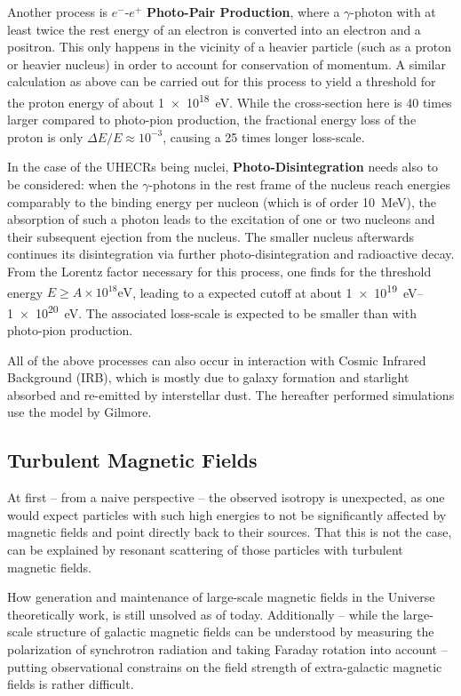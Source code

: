 Another process is $e^-$-$e^+$ \textbf{Photo-Pair Production}, where a
$\gamma$-photon with at least twice the rest energy of an electron is converted
into an electron and a positron. This only happens in the vicinity of a
heavier particle (such as a proton or heavier nucleus) in order to account for
conservation of momentum. A similar calculation as above can be carried out for
this process to yield a threshold for the proton energy of about
\SI{1e18}{\electronvolt}. While the cross-section here is 40 times larger
compared to photo-pion production, the fractional energy loss of the proton is
only $\Delta{E}/E\approx10^{-3}$, causing a 25 times longer
loss-scale.

In the case of the UHECRs being nuclei, \textbf{Photo-Disintegration} needs
also to
be considered: when the $\gamma$-photons in the rest frame of the nucleus reach
energies comparably to the binding energy per nucleon (which is of order
\SI{10}{\mega\electronvolt}), the absorption of such a photon leads to the
excitation of one or two nucleons and their subsequent ejection from the
nucleus. The smaller nucleus afterwards continues its disintegration via
further photo-disintegration and radioactive decay. From the Lorentz factor
necessary for this process, one finds for the threshold energy
$E\ge{A\times10^{18}}\si{\electronvolt}$, leading to a expected cutoff at about
\SIrange{1e19}{1e20}{\electronvolt}. The associated loss-scale is expected to
be smaller than with photo-pion production.

All of the above processes can also occur in interaction with Cosmic Infrared
Background (IRB), which is mostly due to galaxy formation and starlight absorbed
and re-emitted by interstellar dust. The hereafter performed simulations
use the model by Gilmore\autocite{Gilmore2012}.


\subsection{Turbulent Magnetic Fields}
\label{sec:intro-turbulence}
At first -- from a naive perspective -- the observed isotropy is unexpected, as
one would expect particles with such high energies to not be significantly
affected by magnetic fields and point directly back to their sources. That this
is not the case, can be explained by resonant scattering of those particles
with turbulent magnetic fields.

How generation and maintenance of large-scale magnetic fields in the Universe
theoretically work, is still unsolved as of today. Additionally -- while the
large-scale structure of galactic magnetic fields can be understood by
measuring the polarization of synchrotron radiation and taking Faraday rotation
into account -- putting observational constrains on the field strength
of extra-galactic magnetic fields is rather difficult.

